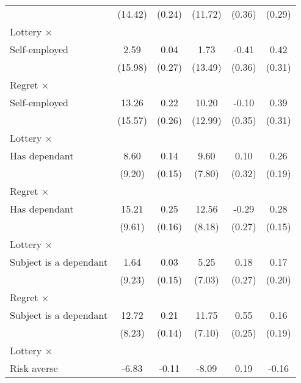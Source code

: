 \begin{table}[htbp]
\begin{tabular}{l*{5}{c}}
                &  (14.42)         &   (0.24)         &  (11.72)         &   (0.36)         &   (0.29)         \\
\addlinespace
Lottery $\times$ \\ Self-employed&     2.59         &     0.04         &     1.73         &    -0.41         &     0.42         \\
                &  (15.98)         &   (0.27)         &  (13.49)         &   (0.36)         &   (0.31)         \\
\addlinespace
Regret $\times$ \\ Self-employed&    13.26         &     0.22         &    10.20         &    -0.10         &     0.39         \\
                &  (15.57)         &   (0.26)         &  (12.99)         &   (0.35)         &   (0.31)         \\
\addlinespace
Lottery $\times$ \\ Has dependant&     8.60         &     0.14         &     9.60         &     0.10         &     0.26         \\
                &   (9.20)         &   (0.15)         &   (7.80)         &   (0.32)         &   (0.19)         \\
\addlinespace
Regret $\times$ \\ Has dependant&    15.21         &     0.25         &    12.56         &    -0.29         &     0.28\sym{*}  \\
                &   (9.61)         &   (0.16)         &   (8.18)         &   (0.27)         &   (0.15)         \\
\addlinespace
Lottery $\times$ \\ Subject is a dependant&     1.64         &     0.03         &     5.25         &     0.18         &     0.17         \\
                &   (9.23)         &   (0.15)         &   (7.03)         &   (0.27)         &   (0.20)         \\
\addlinespace
Regret $\times$ \\ Subject is a dependant&    12.72         &     0.21         &    11.75\sym{*}  &     0.55\sym{**} &     0.16         \\
                &   (8.23)         &   (0.14)         &   (7.10)         &   (0.25)         &   (0.19)         \\
\addlinespace
Lottery $\times$ \\ Risk averse&    -6.83         &    -0.11         &    -8.09         &     0.19         &    -0.16         \\

\end{tabular}
\end{table}
